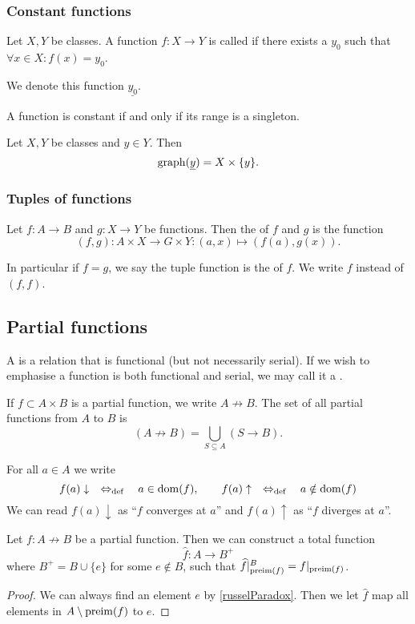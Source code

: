 \subsubsection{Constant functions}
\begin{definition}
Let $X,Y$ be classes. A function $f:X\to Y$ is called  if there exists a $y_0$ such that $\forall x\in X: f(x) = y_0$.

We denote this function $\underline{y_0}$.
\end{definition}

A function is constant if and only if its range is a singleton.

\begin{lemma}
Let $X,Y$ be classes and $y\in Y$. Then
\[ \operatorname{graph}(\underline{y}) = X\times \{y\}. \]
\end{lemma}

\subsubsection{Tuples of functions}
\begin{definition}
Let $f: A\to B$ and $g: X\to Y$ be functions. Then the  of $f$ and $g$ is the function
\[ (f,g): A\times X \to G\times Y: (a,x) \mapsto (f(a), g(x)). \]

In particular if $f=g$, we say the tuple function is the  of $f$. We write $f$ instead of $(f,f)$.
\end{definition}

\subsection{Partial functions}
\begin{definition}
A  is a relation that is functional (but not necessarily serial). If we wish to emphasise a function is both functional and serial, we may call it a .
\end{definition}
If $f\subset A\times B$ is a partial function, we write $A\not \to B$. The set of all partial functions from $A$ to $B$ is
\[ (A\not \to B) = \bigcup _{S\subseteq A}(S\to B). \]

For all $a\in A$ we write
\[ f(a)\downarrow \quad\Leftrightarrow_{\text{def}}\quad a\in\operatorname{dom}(f),\qquad f(a)\uparrow \quad\Leftrightarrow_{\text{def}}\quad a\notin\operatorname{dom}(f) \]
We can read $f(a)\downarrow$ as ``$f$ converges at $a$'' and $f(a)\uparrow$ as ``$f$ diverges at $a$''.

\begin{lemma} \label{partialFunctionExtension}
Let $f: A \not\to B$ be a partial function. Then we can construct a total function
\[ \widehat{f}: A \to B^+ \]
where $B^+ = B\cup \{e\}$ for some $e\notin B$, such that $\widehat{f}|_{\operatorname{preim}(f)}^B = f|_{\operatorname{preim}(f)}$.
\end{lemma}
\begin{proof}
We can always find an element $e$ by \ref{russelParadox}. Then we let $\widehat{f}$ map all elements in $A\setminus\operatorname{preim}(f)$ to $e$.
\end{proof}


